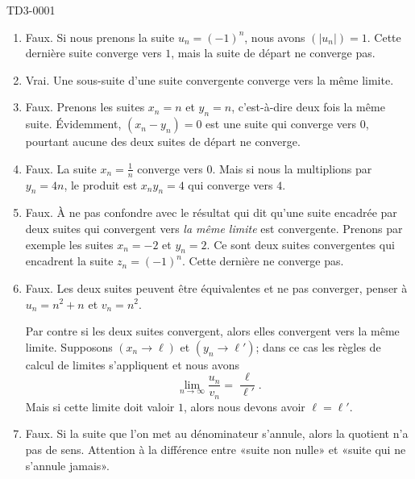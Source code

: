 \begin{corrige}{TD3-0001}
\begin{enumerate}
		\item
			Faux. Si nous prenons la suite $u_n=(-1)^n$, nous avons $(| u_n |)=1$. Cette dernière suite converge vers $1$, mais la suite de départ ne converge pas.
		\item
			Vrai. Une sous-suite d'une suite convergente converge vers la même limite.
		\item
			Faux. Prenons les suites $x_n=n$ et $y_n=n$, c'est-à-dire deux fois la même suite. Évidemment, $(x_n-y_n)=0$ est une suite qui converge vers $0$, pourtant aucune des deux suites de départ ne converge.
		\item
			Faux. La suite $x_n=\frac{1}{ n }$ converge vers $0$. Mais si nous la multiplions par $y_n=4n$, le produit est $x_ny_n=4$ qui converge vers $4$.
		\item
			Faux. À ne pas confondre avec le résultat qui dit qu'une suite encadrée par deux suites qui convergent vers \emph{la même limite} est convergente. Prenons par exemple les suites $x_n=-2$ et $y_n=2$. Ce sont deux suites convergentes qui encadrent la suite $z_n=(-1)^n$. Cette dernière ne converge pas.
		\item
            Faux. Les deux suites peuvent être équivalentes et ne pas converger, penser à \( u_n=n^2+n\) et \( v_n=n^2\). 

            Par contre si les deux suites convergent, alors elles convergent vers la même limite. Supposons $(x_n\to\ell)$ et $(y_n\to\ell')$; dans ce cas les règles de calcul de limites s'appliquent et nous avons
			\begin{equation}
                \lim_{n\to \infty} \frac{ u_n }{ v_n }=\frac{ \ell }{ \ell' }.
			\end{equation}
            Mais si cette limite doit valoir \( 1\), alors nous devons avoir \( \ell=\ell'\).
		\item
			Faux. Si la suite que l'on met au dénominateur s'annule, alors la quotient n'a pas de sens. Attention à la différence entre «suite non nulle» et «suite qui ne s'annule jamais».
	\end{enumerate}

\end{corrige}
